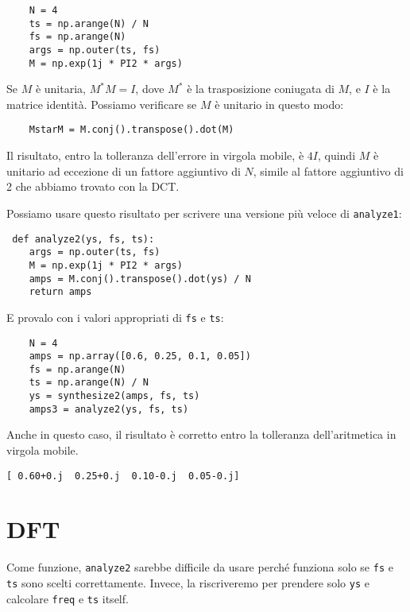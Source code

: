 \documentclass[12pt,a4paper]{book}
\begin{document}
\begin{verbatim} 
    N = 4
    ts = np.arange(N) / N
    fs = np.arange(N)
    args = np.outer(ts, fs)
    M = np.exp(1j * PI2 * args)
 \end{verbatim} 

Se $M$ è unitaria, $M^*M = I$, dove $M^*$ è la trasposizione coniugata di $M$, e $I$ è la matrice identità. Possiamo verificare se $M$ è unitario in questo modo:

\begin{verbatim} 
    MstarM = M.conj().transpose().dot(M)
 \end{verbatim} 

Il risultato, entro la tolleranza dell'errore in virgola mobile, è $4 I$, quindi $M$ è unitario ad eccezione di un fattore aggiuntivo di $N$, simile al fattore aggiuntivo di 2 che abbiamo trovato con la DCT.

Possiamo usare questo risultato per scrivere una versione più veloce di {\tt analyze1}:

\begin{verbatim} def analyze2(ys, fs, ts):
    args = np.outer(ts, fs)
    M = np.exp(1j * PI2 * args)
    amps = M.conj().transpose().dot(ys) / N
    return amps
 \end{verbatim} 

E provalo con i valori appropriati di {\tt fs} e {\tt ts}:

\begin{verbatim} 
    N = 4
    amps = np.array([0.6, 0.25, 0.1, 0.05])
    fs = np.arange(N)
    ts = np.arange(N) / N
    ys = synthesize2(amps, fs, ts)
    amps3 = analyze2(ys, fs, ts)
 \end{verbatim} 

Anche in questo caso, il risultato è corretto entro la tolleranza dell'aritmetica in virgola mobile.

\begin{verbatim} 
[ 0.60+0.j  0.25+0.j  0.10-0.j  0.05-0.j]
 \end{verbatim} 

\section{DFT} \label{dftsection} 

Come funzione, {\tt analyze2} sarebbe difficile da usare perché funziona solo se {\tt fs} e {\tt ts} sono scelti correttamente. Invece, la riscriveremo per prendere solo {\tt ys} e calcolare {\tt freq} e {\tt ts} itself.
\end{document}
